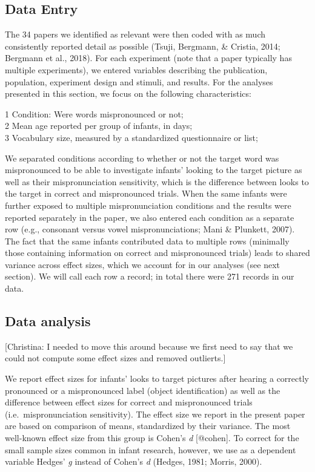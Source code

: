 \documentclass[man]{apa6}
\theoremstyle{definition}
\theoremstyle{definition}
\theoremstyle{definition}
\theoremstyle{remark}
\begin{document}
\subsection{Data Entry}\label{data-entry}

The 34 papers we identified as relevant were then coded with as much
consistently reported detail as possible (Tsuji, Bergmann, \& Cristia,
2014; Bergmann et al., 2018). For each experiment (note that a paper
typically has multiple experiments), we entered variables describing the
publication, population, experiment design and stimuli, and results. For
the analyses presented in this section, we focus on the following
characteristics:

1 Condition: Were words mispronounced or not;\\
2 Mean age reported per group of infants, in days;\\
3 Vocabulary size, measured by a standardized questionnaire or list;

We separated conditions according to whether or not the target word was
mispronounced to be able to investigate infants' looking to the target
picture as well as their mispronunciation sensitivity, which is the
difference between looks to the target in correct and mispronounced
trials. When the same infants were further exposed to multiple
mispronunciation conditions and the results were reported separately in
the paper, we also entered each condition as a separate row (e.g.,
consonant versus vowel mispronunciations; Mani \& Plunkett, 2007). The
fact that the same infants contributed data to multiple rows (minimally
those containing information on correct and mispronounced trials) leads
to shared variance across effect sizes, which we account for in our
analyses (see next section). We will call each row a record; in total
there were 271 records in our data.

\subsection{Data analysis}\label{data-analysis}

{[}Christina: I needed to move this around because we first need to say
that we could not compute some effect sizes and removed outlierts.{]}

We report effect sizes for infants' looks to target pictures after
hearing a correctly pronounced or a mispronounced label (object
identification) as well as the difference between effect sizes for
correct and mispronounced trials (i.e.~mispronunciation sensitivity).
The effect size we report in the present paper are based on comparison
of means, standardized by their variance. The most well-known effect
size from this group is Cohen's \emph{d} {[}@cohen{]}. To correct for
the small sample sizes common in infant research, however, we use as a
dependent variable Hedges' \emph{g} instead of Cohen's \emph{d} (Hedges,
1981; Morris, 2000).
\end{document}

